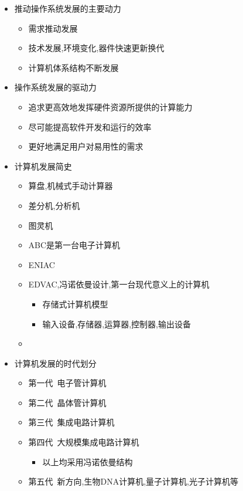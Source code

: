 \documentclass[a4paper,10pt,notitlepage]{article}
\begin{document}
\begin{itemize}
	\item 推动操作系统发展的主要动力
	\begin{itemize}
		\item 需求推动发展
		\item 技术发展,环境变化,器件快速更新换代
		\item 计算机体系结构不断发展
	\end{itemize}
	
	\item 操作系统发展的驱动力
	\begin{itemize}
		\item 追求更高效地发挥硬件资源所提供的计算能力
		\item 尽可能提高软件开发和运行的效率
		\item 更好地满足用户对易用性的需求
	\end{itemize}
	
	\item 计算机发展简史
	\begin{itemize}
		\item 算盘,机械式手动计算器
		\item 差分机,分析机
		\item 图灵机
		\item ABC是第一台电子计算机
		\item ENIAC
		\item EDVAC,冯诺依曼设计,第一台现代意义上的计算机
		\begin{itemize}
			\item 存储式计算机模型
			\item 输入设备,存储器,运算器,控制器,输出设备
		\end{itemize}
		\item 
	\end{itemize}
	
	\item 计算机发展的时代划分
	\begin{itemize}
		\item 第一代\ 电子管计算机
		\item 第二代\ 晶体管计算机
		\item 第三代\ 集成电路计算机
		\item 第四代\ 大规模集成电路计算机
		\begin{itemize}
			\item 以上均采用冯诺依曼结构
		\end{itemize}
		\item 第五代\ 新方向,生物DNA计算机,量子计算机,光子计算机等
	\end{itemize}
	

\end{itemize}
\end{document}
